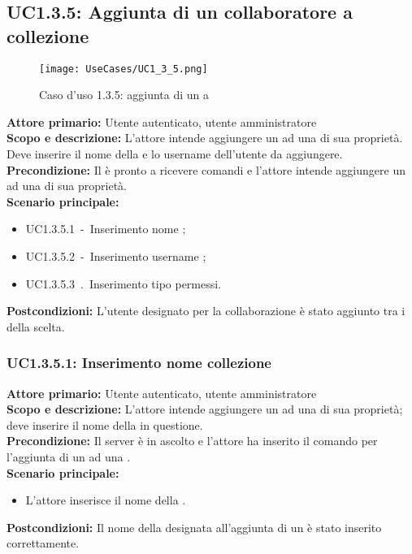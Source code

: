 \documentclass{scalatekids-article}
\begin{document}
\subsection{UC1.3.5: Aggiunta di un collaboratore a collezione}

\begin{figure}[H]
  \begin{center}
    \texttt{[image: UseCases/UC1\_3\_5.png]}
    \caption{Caso d'uso 1.3.5: aggiunta di un  a }
  \end{center}
\end{figure}
\textbf{Attore primario:} Utente autenticato, utente amministratore\\
\textbf{Scopo e descrizione:} L'attore intende aggiungere un  ad una  di sua proprietà. Deve inserire il nome della  e lo username dell'utente da aggiungere.\\
\textbf{Precondizione:} Il  è pronto a ricevere comandi e l'attore intende aggiungere un  ad una  di sua proprietà.\\
\textbf{Scenario principale:}
\begin{itemize}
\item UC1.3.5.1\ -\ Inserimento nome ;
\item UC1.3.5.2\ -\ Inserimento username ;
\item UC1.3.5.3\ .\ Inserimento tipo permessi.
\end{itemize}
\textbf{Postcondizioni:} L'utente designato per la collaborazione è stato aggiunto tra i  della  scelta.

\subsubsection{UC1.3.5.1: Inserimento nome collezione}

\textbf{Attore primario:} Utente autenticato, utente amministratore\\
\textbf{Scopo e descrizione:} L'attore intende aggiungere un  ad una  di sua proprietà; deve inserire il nome della  in questione.\\
\textbf{Precondizione:} Il server è in ascolto e l'attore ha inserito il comando per l'aggiunta di un  ad una .\\
\textbf{Scenario principale:}
\begin{itemize}
\item L'attore inserisce il nome della .
\end{itemize}
\textbf{Postcondizioni:} Il nome della  designata all'aggiunta di un  è stato inserito correttamente.
\end{document}
